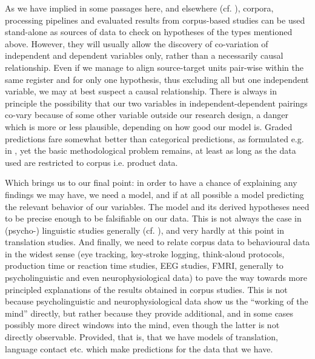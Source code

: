 \documentclass[output=paper]{LSP/langsci}
\begin{document}
\begin{exe}
\begin{exe}
\begin{exe}
\begin{exe}
\begin{exe}
As we have implied in some passages here, and elsewhere (cf. \citealt{AlvesEtAl2010}), corpora, processing pipelines and evaluated results from corpus-based studies can be used stand-alone as sources of data to check on hypotheses of the types mentioned above. However, they will usually allow the discovery of co-variation of independent and dependent variables only, rather than a necessarily causal relationship. Even if we manage to align source-target units pair-wise within the same register and for only one hypothesis, thus excluding all but one independent variable, we may at best suspect a causal relationship. There is always in principle the possibility that our two variables in independent-dependent pairings co-vary because of some other variable outside our research design, a danger which is more or less plausible, depending on how good our model is. Graded predictions fare somewhat better than categorical predictions, as formulated e.g. in \citet[31ff]{Hawkins2004}, yet the basic methodological problem remains, at least as long as the data used are restricted to corpus i.e. product data.

Which brings us to our final point: in order to have a chance of explaining any findings we may have, we need a model, and if at all possible a model predicting the relevant behavior of our variables. The model and its derived hypotheses need to be precise enough to be falsifiable on our data. This is not always the case in (psycho-) linguistic studies generally (cf. \citealt[170ff]{Schlesewsky2009}), and very hardly at this point in translation studies. And finally, we need to relate corpus data to behavioural data in the widest sense (eye tracking, key-stroke logging, think-aloud protocols, production time or reaction time studies, EEG studies, FMRI, generally to psycholinguistic and even neurophysiological data) to pave the way towards more principled explanations of the results obtained in corpus studies. This is not because psycholinguistic and neurophysiological data show us the ``working of the mind'' directly, but rather because they provide additional, and in some cases possibly more direct windows into the mind, even though the latter is not directly observable. Provided, that is, that we have models of translation, language contact etc. which make predictions for the data that we have. 




\end{exe}
\end{exe}
\end{exe}
\end{exe}
\end{exe}
\end{document}
